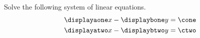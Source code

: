 









\pgfmathtruncatemacro{\money}{\lcmy/\bone}
\pgfmathtruncatemacro{\mtwoy}{\lcmy/\btwo}


\pgfmathtruncatemacro{\maone}{\money*\aone}
\pgfmathtruncatemacro{\matwo}{\mtwoy*\atwo}


\pgfmathtruncatemacro{\cone}{\aone*\x-\bone*\y}
\pgfmathtruncatemacro{\ctwo}{\atwo*\x-\btwo*\y}


\pgfmathtruncatemacro{\monecone}{\money*\cone}
\pgfmathtruncatemacro{\mtwoctwo}{\mtwoy*\ctwo}


\pgfmathtruncatemacro{\coefx}{\maone-\matwo}

\pgfmathtruncatemacro{\cthree}{\monecone-\mtwoctwo}


\pgfmathtruncatemacro{\aonetimesx}{\aone*\x}


\pgfmathtruncatemacro{\coneminusaonex}{\cone-\aone*\x}




\setcounter{equation}{0}


Solve the following system of linear equations.
\begin{align}
\displayaone x - \displaybone y &= \cone  \label{eq-I003-1}\\
\displayatwo x - \displaybtwo y &= \ctwo  \label{eq-I003-2}
\end{align}

